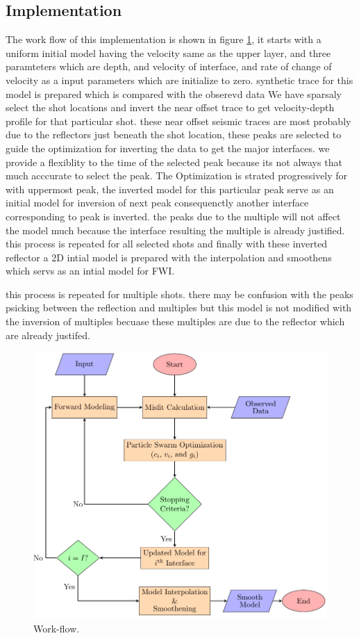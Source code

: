 \documentclass[paper,revised]{geophysics}
\begin{document}
\subsection{Implementation}
The work flow of this implementation is shown in figure \ref{fig:work_flow}, it starts with a uniform initial model having the velocity same as the upper layer, and three paramteters which are depth, and velocity of interface, and rate of change of velocity as a input parameters which are initialize to zero. synthetic trace for this model is prepared which is compared with the obserevd data 
We have sparsaly select the shot locations and invert the near offset trace to get velocity-depth profile for that particular shot.  these near offset seismic traces are most probably due to the reflectors just beneath the shot location, these peaks are selected to guide the optimization for inverting the data to get the major interfaces. we provide a flexiblity to the time of the selected peak because its not always that much acccurate to select the peak. The Optimization is strated progressively for with uppermost peak, the inverted model for this particular peak serve as an initial model for inversion of next peak consequenctly another interface corresponding to peak is inverted. the peaks due to the multiple will not affect the model much because the interface resulting the multiple is already justified. this process is repeated for all selected shots and finally with these inverted reflector a 2D intial model is prepared with the interpolation and smoothens which servs as an intial model for FWI. 



this process is repeated for multiple shots.     there may be confusion with the peaks psicking between the reflection and multiples  but this model is not modified with the inversion of multiples becuase these multiples are due to the reflector which are already justifed.

\begin{figure}	
	\includegraphics[width=0.8\paperwidth]{Fig/flow_chart.png}
	\caption{Work-flow.}
	\label{fig:work_flow}
\end{figure}
\end{document}
